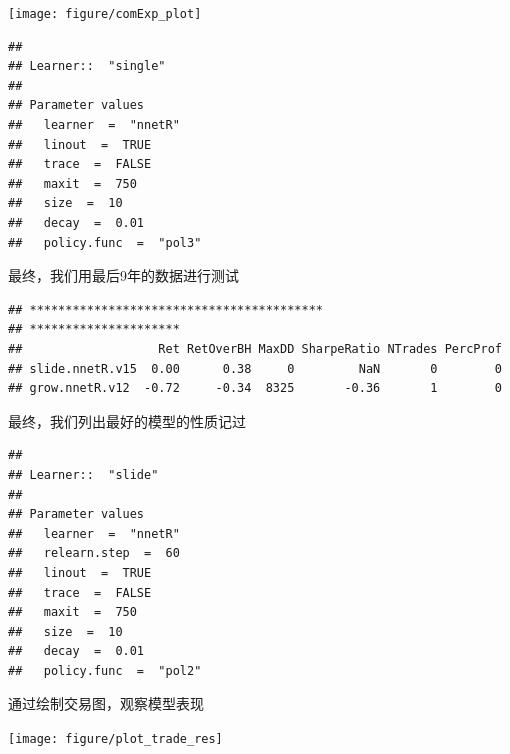 \documentclass{article}\usepackage[]{graphicx}\usepackage[]{color}
\makeatletter
\newenvironment{kframe}{%
 \def\at@end@of@kframe{}%
 \ifinner\ifhmode%
  \def\at@end@of@kframe{\end{minipage}}%
  \begin{minipage}{\columnwidth}%
 \fi\fi%
 \def\FrameCommand##1{\hskip\@totalleftmargin \hskip-\fboxsep
 \colorbox{shadecolor}{##1}\hskip-\fboxsep
     \hskip-\linewidth \hskip-\@totalleftmargin \hskip\columnwidth}%
 \MakeFramed {\advance\hsize-\width
   \@totalleftmargin\z@ \linewidth\hsize
   \@setminipage}}%
 {\par\unskip\endMakeFramed%
 \at@end@of@kframe}
\newenvironment{knitrout}{}{} %
\makeatother
\begin{document}
\begin{CJK*}{UTF8}{gkai}
\begin{knitrout}
{\centering \texttt{[image: figure/comExp\_plot]} 

}



\end{knitrout}
\begin{knitrout}
\color{fgcolor}\begin{kframe}
\begin{verbatim}
## 
## Learner::  "single" 
## 
## Parameter values
## 	 learner  =  "nnetR" 
## 	 linout  =  TRUE 
## 	 trace  =  FALSE 
## 	 maxit  =  750 
## 	 size  =  10 
## 	 decay  =  0.01 
## 	 policy.func  =  "pol3"
\end{verbatim}
\end{kframe}
\end{knitrout}
最终，我们用最后9年的数据进行测试
\begin{knitrout}
\color{fgcolor}\begin{kframe}
\begin{verbatim}
## *****************************************
## *********************
##                   Ret RetOverBH MaxDD SharpeRatio NTrades PercProf
## slide.nnetR.v15  0.00      0.38     0         NaN       0        0
## grow.nnetR.v12  -0.72     -0.34  8325       -0.36       1        0
\end{verbatim}
\end{kframe}
\end{knitrout}

最终，我们列出最好的模型的性质记过
\begin{knitrout}
\color{fgcolor}\begin{kframe}
\begin{verbatim}
## 
## Learner::  "slide" 
## 
## Parameter values
## 	 learner  =  "nnetR" 
## 	 relearn.step  =  60 
## 	 linout  =  TRUE 
## 	 trace  =  FALSE 
## 	 maxit  =  750 
## 	 size  =  10 
## 	 decay  =  0.01 
## 	 policy.func  =  "pol2"
\end{verbatim}
\end{kframe}
\end{knitrout}

通过绘制交易图，观察模型表现

\begin{knitrout}
\color{fgcolor}

{\centering \texttt{[image: figure/plot\_trade\_res]} 

}
\end{knitrout}
\end{CJK*}
\end{document}
